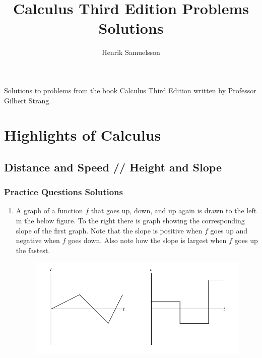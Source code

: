 \documentclass{article}
\title{Calculus Third Edition Problems Solutions}
\author{Henrik Samuelsson}
\begin{document}
\maketitle
Solutions to problems from the book Calculus Third Edition written by Professor Gilbert Strang.
\section{Highlights of Calculus}
\subsection{Distance and Speed // Height and Slope}
\subsubsection{Practice Questions Solutions}
\begin{enumerate}
    \item A graph of a function $f$ that goes up, down, and up again is drawn to the left in the below figure. To the right there is graph showing the corresponding slope of the first graph. Note that the slope is positive when $f$ goes up and negative when $f$ goes down. Also note how the slope is largest when $f$ goes up the fastest.
    \begin{figure}[h]
        \centering
        \includegraphics[width=1.0\textwidth]{slopes.pdf}
      \end{figure}
\end{enumerate}
\end{document}

